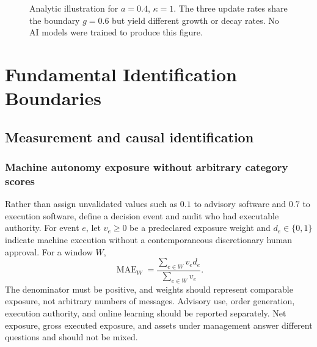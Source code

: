\documentclass[10pt,twocolumn,letterpaper]{article}
\theoremstyle{definition}
\theoremstyle{remark}
\newcommand{\MAE}{\operatorname{MAE}}
\begin{document}
\begin{figure}[htbp]
\centering
{}
\caption{Analytic illustration for $a=0.4$, $\kappa=1$. The three update rates share the boundary $g=0.6$ but yield different growth or decay rates. No AI models were trained to produce this figure.}
\label{fig:boundary}
\end{figure}

\section{Fundamental Identification Boundaries}
\label{sec:ch3}
\subsection{Measurement and causal identification}
\label{sec:measurement}
\subsubsection{Machine autonomy exposure without arbitrary category scores}
Rather than assign unvalidated values such as $0.1$ to advisory software and $0.7$ to execution software, define a decision event and audit who had executable authority. For event $e$, let $v_e\geq0$ be a predeclared exposure weight and $d_e\in\{0,1\}$ indicate machine execution without a contemporaneous discretionary human approval. For a window $W$,
\begin{equation}
 \MAE_W=\frac{\sum_{e\in W}v_e d_e}{\sum_{e\in W}v_e}.
 \label{eq:mae}
\end{equation}
The denominator must be positive, and weights should represent comparable exposure, not arbitrary numbers of messages. Advisory use, order generation, execution authority, and online learning should be reported separately. Net exposure, gross executed exposure, and assets under management answer different questions and should not be mixed.
\end{document}
